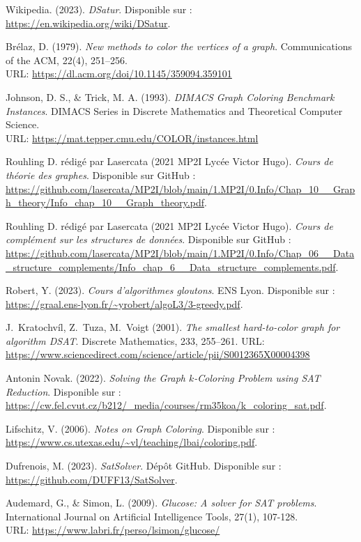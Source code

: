 \documentclass[11pt]{article}
\begin{document}
\begin{thebibliography}{99}

Wikipedia. (2023). \textit{DSatur}. Disponible sur : \url{https://en.wikipedia.org/wiki/DSatur}.

Brélaz, D. (1979). \textit{New methods to color the vertices of a graph}. Communications of the ACM, 22(4), 251–256.
\\ URL: \url{https://dl.acm.org/doi/10.1145/359094.359101}

Johnson, D. S., \& Trick, M. A. (1993). \textit{DIMACS Graph Coloring Benchmark Instances}. DIMACS Series in Discrete Mathematics and Theoretical Computer Science. 
\\ URL: \url{https://mat.tepper.cmu.edu/COLOR/instances.html}

Rouhling D. rédigé par Lasercata (2021 MP2I Lycée Victor Hugo). \textit{Cours de théorie des graphes}. Disponible sur GitHub : \url{https://github.com/lasercata/MP2I/blob/main/1.MP2I/0.Info/Chap_10__Graph_theory/Info_chap_10__Graph_theory.pdf}.

Rouhling D. rédigé par Lasercata (2021 MP2I Lycée Victor Hugo). \textit{Cours de complément sur les structures de données}. Disponible sur GitHub : \url{https://github.com/lasercata/MP2I/blob/main/1.MP2I/0.Info/Chap_06__Data_structure_complements/Info_chap_6__Data_structure_complements.pdf}.

Robert, Y. (2023). \textit{Cours d'algorithmes gloutons}. ENS Lyon. Disponible sur : \url{https://graal.ens-lyon.fr/~yrobert/algoL3/3-greedy.pdf}.

J.~Kratochvíl, Z.~Tuza, M.~Voigt (2001). \textit{The smallest hard-to-color graph for algorithm DSAT}. Discrete Mathematics, 233, 255–261.  
URL: \url{https://www.sciencedirect.com/science/article/pii/S0012365X00004398}

Antonin Novak. (2022). \textit{Solving the Graph \(k\)-Coloring Problem using SAT Reduction}. Disponible sur : \url{https://cw.fel.cvut.cz/b212/_media/courses/rm35koa/k_coloring_sat.pdf}.

Lifschitz, V. (2006). \textit{Notes on Graph Coloring}. Disponible sur : \url{https://www.cs.utexas.edu/~vl/teaching/lbai/coloring.pdf}.

Dufrenois, M. (2023). \textit{SatSolver}. Dépôt GitHub. Disponible sur : \url{https://github.com/DUFF13/SatSolver}.

Audemard, G., \& Simon, L. (2009). \textit{Glucose: A solver for SAT problems}. International Journal on Artificial Intelligence Tools, 27(1), 107-128.
\\ URL: \url{https://www.labri.fr/perso/lsimon/glucose/}

\end{thebibliography}
\end{document}

